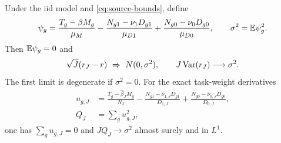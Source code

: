 \begin{proposition}
\label{prop:source-population}
Under the iid model and \eqref{eq:source-bounds}, define
\begin{equation}
 \psi_g=\frac{T_g-\beta M_g}{\mu_M}
 -\frac{N_{g1}-\nu_1D_{g1}}{\mu_{D1}}
 +\frac{N_{g0}-\nu_0D_{g0}}{\mu_{D0}},\qquad
 \sigma^2=\mathbb{E}\psi_g^2.
 \label{eq:source-influence}
\end{equation}
Then $\mathbb{E}\psi_g=0$ and
\begin{equation}
 \sqrt J(r_J-r)\ \Rightarrow\ N(0,\sigma^2),\qquad
 J\operatorname{Var}(r_J)\longrightarrow\sigma^2.
 \label{eq:source-limit}
\end{equation}
The first limit is degenerate if $\sigma^2=0$. For the exact task-weight derivatives
\begin{equation}
 \begin{split}
 u_{g,J}&=\frac{T_g-\widehat\beta_J M_g}{N_J}
 -\frac{N_{g1}-\widehat\nu_{1,J}D_{g1}}{D_{1,J}}
 +\frac{N_{g0}-\widehat\nu_{0,J}D_{g0}}{D_{0,J}},\\
 Q_J&=\sum_g u_{g,J}^2,
 \end{split}
 \label{eq:source-oracle}
\end{equation}
one has $\sum_g u_{g,J}=0$ and $JQ_J\to\sigma^2$ almost surely and in $L^1$.
\end{proposition}

